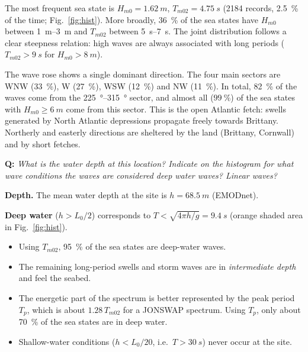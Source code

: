 \documentclass[11pt,a4paper]{article}
\newcommand{\Hs}{H_{m0}}
\newcommand{\Tm}{T_{m02}}
\newcommand{\question}[1]{\par\smallskip\noindent\colorbox{blue!6}{\parbox{\dimexpr\linewidth-2\fboxsep}{\textbf{Q:} \emph{#1}}}\par\smallskip}
\begin{document}
The most frequent sea state is $\Hs=\SI{1.62}{m}$, $\Tm=\SI{4.75}{s}$ (\num{2184} records, \SI{2.5}{\percent} of the time; Fig.~\ref{fig:hist}).
More broadly, \SI{36}{\percent} of the sea states have $\Hs$ between \SIrange{1}{3}{m} and $\Tm$ between \SIrange{5}{7}{s}.
The joint distribution follows a clear steepness relation: high waves are always associated with long periods ($\Tm>\SI{9}{s}$ for $\Hs>\SI{8}{m}$).

The wave rose shows a single dominant direction.
The four main sectors are WNW (\SI{33}{\percent}), W (\SI{27}{\percent}), WSW (\SI{12}{\percent}) and NW (\SI{11}{\percent}).
In total, \SI{82}{\percent} of the waves come from the \SIrange{225}{315}{\degree} sector, and almost all ($\SI{99}{\percent}$) of the sea states with $\Hs\geq\SI{6}{m}$ come from this sector.
This is the open Atlantic fetch: swells generated by North Atlantic depressions propagate freely towards Brittany.
Northerly and easterly directions are sheltered by the land (Brittany, Cornwall) and by short fetches.

\question{What is the water depth at this location? Indicate on the histogram for what wave conditions the waves are considered deep water waves? Linear waves?}

\textbf{Depth.} The mean water depth at the site is $h=\SI{68.5}{m}$ (EMODnet).

\textbf{Deep water} ($h>L_0/2$) corresponds to $T<\sqrt{4\pi h/g}=\SI{9.4}{s}$ (orange shaded area in Fig.~\ref{fig:hist}).
\begin{itemize}
  \item Using $\Tm$, \SI{95}{\percent} of the sea states are deep-water waves.
  \item The remaining long-period swells and storm waves are in \emph{intermediate depth} and feel the seabed.
  \item The energetic part of the spectrum is better represented by the peak period $T_p$, which is about $1.28\,\Tm$ for a JONSWAP spectrum. Using $T_p$, only about \SI{70}{\percent} of the sea states are in deep water.
  \item Shallow-water conditions ($h<L_0/20$, i.e.\ $T>\SI{30}{s}$) never occur at the site.
\end{itemize}
\end{document}
